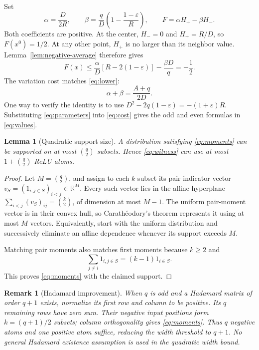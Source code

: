 \documentclass[11pt]{article}
\newtheorem{lemma}[theorem]{Lemma}
\newtheorem{remark}[theorem]{Remark}
\newcommand{\R}{\mathbb R}
\begin{document}
Set
\begin{equation}\label{eq:witness}
 \alpha=\frac D{2R},\qquad
 \beta=\frac qD\left(1-\frac{1-\varepsilon}R\right),\qquad
 F=\alpha H_+-\beta H_-.
\end{equation}
Both coefficients are positive. At the center, $H_-=0$ and
$H_+=R/D$, so $F(x^0)=1/2$. At any other point, $H_+$ is no larger
than its neighbor value. Lemma~\ref{lem:negative-average} therefore
gives
\[
 F(x)\le\frac\alpha D[R-2(1-\varepsilon)]-\frac{\beta D}q
       =-\frac12.
\]
The variation cost matches \eqref{eq:lower}:
\begin{equation}\label{eq:cost}
 \alpha+\beta=\frac{A+q}{2D}.
\end{equation}
One way to verify the identity is to use
$D^2-2q(1-\varepsilon)=-(1+\varepsilon)R$.
Substituting \eqref{eq:parameters} into \eqref{eq:cost} gives the
odd and even formulas in \eqref{eq:values}.

\begin{lemma}[Quadratic support size]\label{lem:design}
A distribution satisfying \eqref{eq:moments} can be supported on at
most $\binom q2$ subsets. Hence \eqref{eq:witness} can use at most
$1+\binom q2$ ReLU atoms.
\end{lemma}
\begin{proof}
Let $M=\binom q2$, and assign to each $k$-subset its pair-indicator
vector $v_S=(1_{i,j\in S})_{i<j}\in\R^M$. Every such vector lies in
the affine hyperplane $\sum_{i<j}(v_S)_{ij}=\binom k2$, of dimension
at most $M-1$. The uniform pair-moment vector is in their convex
hull, so Carath\'eodory's theorem represents it using at most $M$
vectors. Equivalently, start with the uniform distribution and
successively eliminate an affine dependence whenever its support
exceeds $M$.

Matching pair moments also matches first moments because $k\ge2$
and
\[
 \sum_{j\ne i}1_{i,j\in S}=(k-1)1_{i\in S}.
\]
This proves \eqref{eq:moments} with the claimed support.
\end{proof}

\begin{remark}[Hadamard improvement]
When $q$ is odd and a Hadamard matrix of order $q+1$ exists, normalize
its first row and column to be positive. Its $q$ remaining rows have
zero sum. Their negative input positions form $k=(q+1)/2$ subsets;
column orthogonality gives \eqref{eq:moments}. Thus $q$ negative
atoms and one positive atom suffice, reducing the width threshold
to $q+1$. No general Hadamard existence assumption is used in the
quadratic width bound.
\end{remark}
\end{document}
